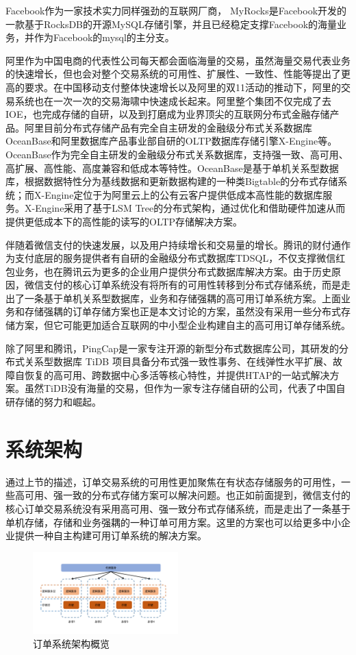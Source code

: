 \documentclass[letterpaper,twocolumn,10pt]{article}
\begin{document}
Facebook作为一家技术实力同样强劲的互联网厂商， MyRocks是Facebook开发的一款基于RocksDB的开源MySQL存储引擎，并且已经稳定支撑Facebook的海量业务，并作为Facebook的mysql的主分支。

阿里作为中国电商的代表性公司每天都会面临海量的交易，虽然海量交易代表业务的快速增长，但也会对整个交易系统的可用性、扩展性、一致性、性能等提出了更高的要求。在中国移动支付整体快速增长以及阿里的双11活动的推动下，阿里的交易系统也在一次一次的交易海啸中快速成长起来。阿里整个集团不仅完成了去IOE，也完成存储的自研，以及到打磨成为业界顶尖的互联网分布式金融存储产品。阿里目前分布式存储产品有完全自主研发的金融级分布式关系数据库OceanBase和阿里数据库产品事业部自研的OLTP数据库存储引擎X-Engine等。OceanBase作为完全自主研发的金融级分布式关系数据库，支持强一致、高可用、高扩展、高性能、高度兼容和低成本等特性。OceanBase是基于单机关系型数据库，根据数据特性分为基线数据和更新数据构建的一种类Bigtable的分布式存储系统；而X-Engine定位于为阿里云上的公有云客户提供低成本高性能的数据库服务。X-Engine采用了基于LSM Tree的分布式架构，通过优化和借助硬件加速从而提供更低成本下的高性能的读写的OLTP存储解决方案。

伴随着微信支付的快速发展，以及用户持续增长和交易量的增长。腾讯的财付通作为支付底层的服务提供者有自研的金融级分布式数据库TDSQL，不仅支撑微信红包业务，也在腾讯云为更多的企业用户提供分布式数据库解决方案。由于历史原因，微信支付的核心订单系统没有将所有的可用性转移到分布式存储系统，而是走出了一条基于单机关系型数据库，业务和存储强耦的高可用订单系统方案。上面业务和存储强耦的订单存储方案也正是本文讨论的方案，虽然没有采用一些分布式存储方案，但它可能更加适合互联网的中小型企业构建自主的高可用订单存储系统。

除了阿里和腾讯，PingCap是一家专注开源的新型分布式数据库公司，其研发的分布式关系型数据库 TiDB 项目具备分布式强一致性事务、在线弹性水平扩展、故障自恢复的高可用、跨数据中心多活等核心特性，并提供HTAP的一站式解决方案。虽然TiDB没有海量的交易，但作为一家专注存储自研的公司，代表了中国自研存储的努力和崛起。


\section{系统架构}
通过上节的描述，订单交易系统的可用性更加聚焦在有状态存储服务的可用性，一些高可用、强一致的分布式存储方案可以解决问题。也正如前面提到，微信支付的核心订单交易系统没有采用高可用、强一致分布式存储系统，而是走出了一条基于单机存储，存储和业务强耦的一种订单可用方案。这里的方案也可以给更多中小企业提供一种自主构建可用订单系统的解决方案。

\begin{figure}[htbp]
\begin{center}
\includegraphics[width=0.5\textwidth]{./figure_1.png}
\caption{订单系统架构概览}
\label{Figure1}
\end{center}
\end{figure}
\end{document}
